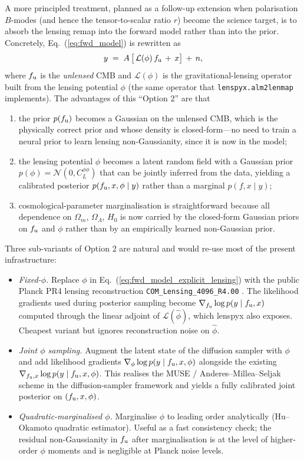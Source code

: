 \documentclass[11pt]{article}
\theoremstyle{definition}
\begin{document}
A more principled treatment, planned as a follow-up extension when polarisation $B$-modes (and hence the tensor-to-scalar ratio $r$) become the science target, is to absorb the lensing remap into the forward model rather than into the prior. Concretely, Eq.~(\ref{eq:fwd_model}) is rewritten as
\begin{align}
  y \;=\; A\,\bigl[\,\mathcal L(\phi)\,f_{\rm u} \,+\, x\bigr] \,+\, n,
  \label{eq:fwd_model_explicit_lensing}
\end{align}
where $f_{\rm u}$ is the \emph{unlensed} CMB and $\mathcal L(\phi)$ is the gravitational-lensing operator built from the lensing potential $\phi$ (the same operator that \texttt{lenspyx.alm2lenmap} implements). The advantages of this ``Option 2'' are that
\begin{enumerate}[leftmargin=2.0em,itemsep=0.1em]
  \item the prior $p(f_{\rm u})$ becomes a Gaussian on the unlensed CMB, which is the physically correct prior and whose density is closed-form---no need to train a neural prior to learn lensing non-Gaussianity, since it is now in the model;
  \item the lensing potential $\phi$ becomes a latent random field with a Gaussian prior $p(\phi)=\mathcal N(0,C_L^{\phi\phi})$ that can be jointly inferred from the data, yielding a calibrated posterior $p(f_{\rm u},x,\phi\mid y)$ rather than a marginal $p(f,x\mid y)$;
  \item cosmological-parameter marginalisation is straightforward because all dependence on $\Omega_m$, $\Omega_\Lambda$, $H_0$ is now carried by the closed-form Gaussian priors on $f_{\rm u}$ and $\phi$ rather than by an empirically learned non-Gaussian prior.
\end{enumerate}
Three sub-variants of Option 2 are natural and would re-use most of the present infrastructure:
\begin{itemize}[leftmargin=1.5em,itemsep=0.1em]
  \item \emph{Fixed-$\phi$.} Replace $\phi$ in Eq.~(\ref{eq:fwd_model_explicit_lensing}) with the public Planck PR4 lensing reconstruction \texttt{COM\_Lensing\_4096\_R4.00} \cite{carron2022planckpr4lensing}. The likelihood gradients used during posterior sampling become $\nabla_{f_{\rm u}}\log p(y\mid f_{\rm u},x)$ computed through the linear adjoint of $\mathcal L(\hat\phi)$, which lenspyx also exposes. Cheapest variant but ignores reconstruction noise on $\hat\phi$.
  \item \emph{Joint $\phi$ sampling.} Augment the latent state of the diffusion sampler with $\phi$ and add likelihood gradients $\nabla_{\phi}\log p(y\mid f_{\rm u},x,\phi)$ alongside the existing $\nabla_{f_{\rm u},x}\log p(y\mid f_{\rm u},x,\phi)$. This realises the MUSE / Anderes--Millea--Seljak scheme \cite{millea2020muse} in the diffusion-sampler framework and yields a fully calibrated joint posterior on $(f_{\rm u},x,\phi)$.
  \item \emph{Quadratic-marginalised $\phi$.} Marginalise $\phi$ to leading order analytically (Hu--Okamoto quadratic estimator). Useful as a fast consistency check; the residual non-Gaussianity in $f_{\rm u}$ after marginalisation is at the level of higher-order $\phi$ moments and is negligible at Planck noise levels.
\end{itemize}
\end{document}
